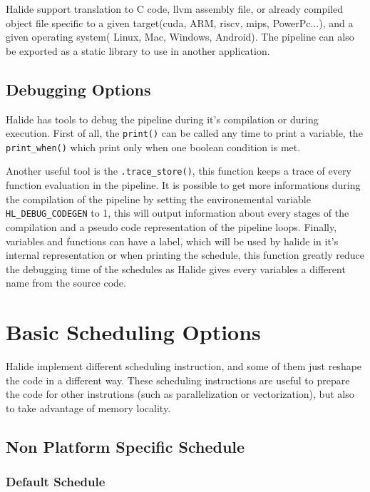 	 Halide support translation to C code, \gls{llvm} assembly file, or already compiled object file specific to a given target(\gls{cuda}, ARM, \gls{riscv}, \gls{mips}, PowerPc...), and a given operating system( Linux, Mac, Windows, Android). The pipeline can also be exported as a static library to use in another application.

\subsection{Debugging Options}
	Halide has tools to debug the pipeline during it's compilation or during execution. First of all, the \verb|print()| can be called any time to print a variable, the \verb|print_when()| which print only when one boolean condition is met.

	Another useful tool is the \verb|.trace_store()|, this function keeps a trace of every function evaluation in the pipeline. It is possible to get more informations during the compilation of the pipeline by setting the environemental variable \verb|HL_DEBUG_CODEGEN| to 1, this will output information about every stages of the compilation and a pseudo code representation of the pipeline loops.
	Finally, variables and functions can have a label, which will be used by halide in it's internal representation or when printing the schedule, this function greatly reduce the debugging time of the schedules as Halide gives every variables a different name from the source code.

	\section {Basic Scheduling Options}
	\label{section:scheduling}

	Halide implement different scheduling instruction, and some of them just reshape the code in a different way. These scheduling instructions are useful to prepare the code for other instrutions (such as parallelization or vectorization), but also to  take advantage of memory locality.
\newcommand\EIW{.4\textwidth}
\newcommand\ECW{\textwidth - \EIW}
	\subsection{ Non Platform Specific Schedule}

	\subsubsection{Default Schedule}


